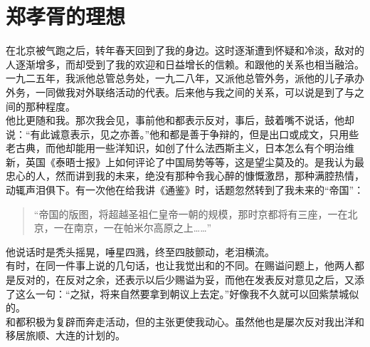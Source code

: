 \fancyhead[RO]{} %
\fancyhead[LE]{} %
\chapter*{郑孝胥的理想}
\thispagestyle{empty}
在北京被气跑之后，转年春天回到了我的身边。这时逐渐遭到怀疑和冷淡，敌对的人逐渐增多，而却受到了我的欢迎和日益增长的信赖。和跟他的关系也相当融洽。一九二五年，我派他总管总务处，一九二八年，又派他总管外务，派他的儿子承办外务，一同做我对外联络活动的代表。后来他与我之间的关系，可以说是到了与之间的那种程度。\\

他比更随和我。那次我会见，事前他和都表示反对，事后，鼓着嘴不说话，他却说：“有此诚意表示，见之亦善。”他和都是善于争辩的，但是出口或成文，只用些老古典，而他却能用一些洋知识，如创了什么法西斯主义，日本怎么有个明治维新，英国《泰晤士报》上如何评论了中国局势等等，这是望尘莫及的。是我认为最忠心的人，然而讲到我的未来，绝没有那种令我心醉的慷慨激昂，那种满腔热情，动辄声泪俱下。有一次他在给我讲《通鉴》时，话题忽然转到了我未来的“帝国”：\\

\begin{quote}
	“帝国的版图，将超越圣祖仁皇帝一朝的规模，那时京都将有三座，一在北京，一在南京，一在帕米尔高原之上……”\\
\end{quote}

他说话时是秃头摇晃，唾星四溅，终至四肢颤动，老泪横流。\\

有时，在同一件事上说的几句话，也让我觉出和的不同。在赐谥问题上，他两人都是反对的，在反对之余，还表示以后少赐谥为妥，而他在发表反对意见之后，又添了这么一句：“之狱，将来自然要拿到朝议上去定。”好像我不久就可以回紫禁城似的。\\

和都积极为复辟而奔走活动，但的主张更使我动心。虽然他也是屡次反对我出洋和移居旅顺、大连的计划的。\\

